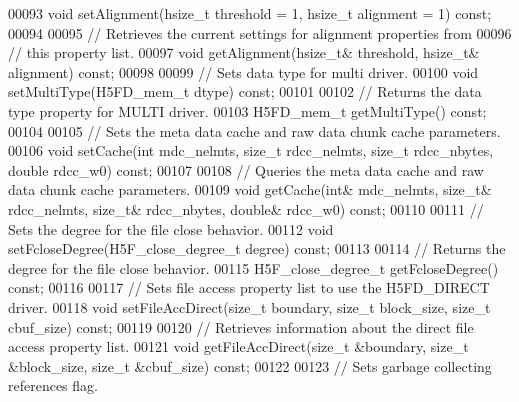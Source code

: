 \begin{DoxyCode}
00093         \textcolor{keywordtype}{void} setAlignment(hsize\_t threshold = 1, hsize\_t alignment = 1) \textcolor{keyword}{const};
00094 
00095         \textcolor{comment}{// Retrieves the current settings for alignment properties from}
00096         \textcolor{comment}{// this property list.}
00097         \textcolor{keywordtype}{void} getAlignment(hsize\_t& threshold, hsize\_t& alignment) \textcolor{keyword}{const};
00098 
00099         \textcolor{comment}{// Sets data type for multi driver.}
00100         \textcolor{keywordtype}{void} setMultiType(H5FD\_mem\_t dtype) \textcolor{keyword}{const};
00101 
00102         \textcolor{comment}{// Returns the data type property for MULTI driver.}
00103         H5FD\_mem\_t getMultiType() \textcolor{keyword}{const};
00104 
00105         \textcolor{comment}{// Sets the meta data cache and raw data chunk cache parameters.}
00106         \textcolor{keywordtype}{void} setCache(\textcolor{keywordtype}{int} mdc\_nelmts, \textcolor{keywordtype}{size\_t} rdcc\_nelmts, \textcolor{keywordtype}{size\_t} rdcc\_nbytes, \textcolor{keywordtype}{double} rdcc\_w0) \textcolor{keyword}{const};
00107 
00108         \textcolor{comment}{// Queries the meta data cache and raw data chunk cache parameters.}
00109         \textcolor{keywordtype}{void} getCache(\textcolor{keywordtype}{int}& mdc\_nelmts, \textcolor{keywordtype}{size\_t}& rdcc\_nelmts, \textcolor{keywordtype}{size\_t}& rdcc\_nbytes, \textcolor{keywordtype}{double}& rdcc\_w0) \textcolor{keyword}{const};
00110 
00111         \textcolor{comment}{// Sets the degree for the file close behavior.}
00112         \textcolor{keywordtype}{void} setFcloseDegree(H5F\_close\_degree\_t degree) \textcolor{keyword}{const};
00113 
00114         \textcolor{comment}{// Returns the degree for the file close behavior.}
00115         H5F\_close\_degree\_t getFcloseDegree() \textcolor{keyword}{const};
00116 
00117         \textcolor{comment}{// Sets file access property list to use the H5FD\_DIRECT driver.}
00118         \textcolor{keywordtype}{void} setFileAccDirect(\textcolor{keywordtype}{size\_t} boundary, \textcolor{keywordtype}{size\_t} block\_size, \textcolor{keywordtype}{size\_t} cbuf\_size) \textcolor{keyword}{const};
00119 
00120         \textcolor{comment}{// Retrieves information about the direct file access property list.}
00121         \textcolor{keywordtype}{void} getFileAccDirect(\textcolor{keywordtype}{size\_t} &boundary, \textcolor{keywordtype}{size\_t} &block\_size, \textcolor{keywordtype}{size\_t} &cbuf\_size) \textcolor{keyword}{const};
00122 
00123         \textcolor{comment}{// Sets garbage collecting references flag.}

\end{DoxyCode}

